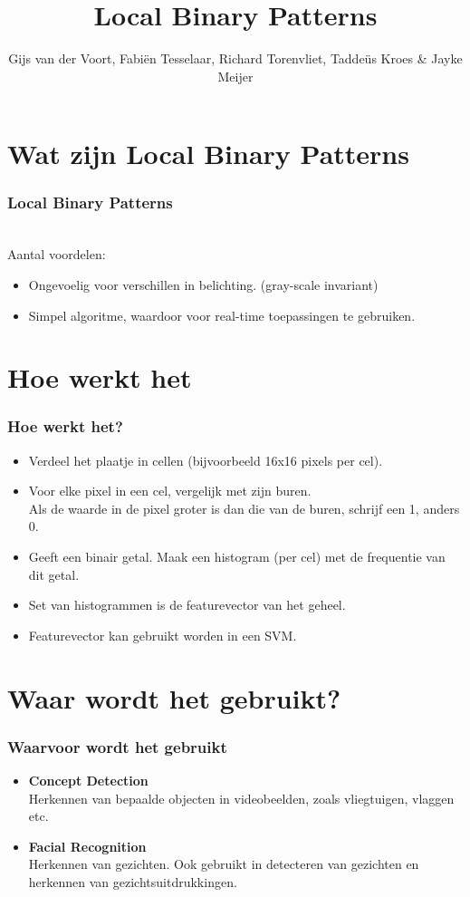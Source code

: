 \documentclass{beamer}
\author{Gijs van der Voort, Fabi\"en Tesselaar, Richard Torenvliet, Tadde\"us Kroes \& Jayke Meijer}
\title{Local Binary Patterns}
\begin{document}
	\section{Wat zijn Local Binary Patterns}
		\begin{frame}
			\titlepage
		\end{frame}

		\begin{frame}
			\frametitle{Local Binary Patterns}
			\structure{Type classifier}\\
			\pause
			Aantal voordelen:
			\begin{itemize}
				\item Ongevoelig voor verschillen in belichting. (gray-scale invariant)
				\pause
				\item Simpel algoritme, waardoor voor real-time toepassingen te gebruiken.
			\end{itemize}
		\end{frame}
	
	\section{Hoe werkt het}
		\begin{frame}
			\frametitle{Hoe werkt het?}
			\begin{itemize}
				\item Verdeel het plaatje in cellen (bijvoorbeeld 16x16 pixels per cel).
				\pause
				\item Voor elke pixel in een cel, vergelijk met zijn buren.\\
					  Als de waarde in de pixel groter is dan die van de buren, schrijf een 1, anders 0.
				\pause
				\item Geeft een binair getal. Maak een histogram (per cel) met de frequentie van dit getal.
				\pause
				\item Set van histogrammen is de featurevector van het geheel.
				\pause
				\item Featurevector kan gebruikt worden in een SVM.
			\end{itemize}
		\end{frame}
	
	\section{Waar wordt het gebruikt?}
		\begin{frame}
			\frametitle{Waarvoor wordt het gebruikt}
			\begin{itemize}
				\item \textbf{Concept Detection}\\
					Herkennen van bepaalde objecten in videobeelden, zoals vliegtuigen, vlaggen etc.
				\item \textbf{Facial Recognition}\\
					Herkennen van gezichten. Ook gebruikt in detecteren van gezichten en herkennen van 
					gezichtsuitdrukkingen.
			\end{itemize}	
		
		\end{frame}	
	
\end{document}
